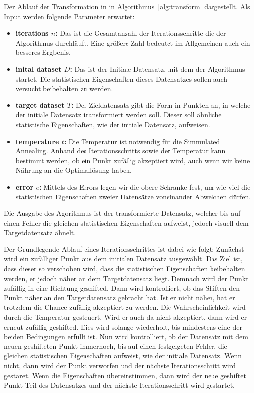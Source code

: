 \documentclass[sigconf]{acmart}
\begin{document}
Der Ablauf der Transformation in in Algorithmus~\ref{alg:transform} dargestellt. Als Input werden folgende Parameter erwartet:
\begin{itemize}
  \item \textbf{iterations $n$:} Das ist die Gesamtanzahl der Iterationsschritte die der Algorithmus durchläuft. Eine größere Zahl bedeutet im Allgemeinen auch ein besseres Ergbenis.
  \item \textbf{inital dataset $D$:} Das ist der Initiale Datensatz, mit dem der Algorithmus startet. Die statistischen Eigenschaften dieses Datensatzes sollen auch versucht beibehalten zu werden.
  \item \textbf{target dataset $T$:} Der Zieldatensatz gibt die Form in Punkten an, in welche der initiale Datensatz transformiert werden soll. Dieser soll ähnliche statistische Eigenschaften, wie der initiale Datensatz, aufweisen.
  \item \textbf{temperature $t$:} Die Temperatur ist notwendig für die Simmulated Annealing. Anhand des Iterationsschritts sowie der Temperatur kann bestimmt werden, ob ein Punkt zufällig akzeptiert wird, auch wenn wir keine Nährung an die Optimallösung haben.
  \item \textbf{error $e$:} Mittels des Errors legen wir die obere Schranke fest, um wie viel die statistischen Eigenschaften zweier Datensätze voneinander Abweichen dürfen.
\end{itemize}

Die Ausgabe des Agorithmus ist der transformierte Datensatz, welcher bis auf einen Fehler die gleichen statistischen Eigenschaften aufweist, jedoch visuell dem Targetdatensatz ähnelt. 

Der Grundlegende Ablauf eines Iterationsschrittes ist dabei wie folgt: Zunächst wird ein zufälliger Punkt aus dem initialen Datensatz ausgewählt. Das Ziel ist, dass dieser so verschoben wird, dass die statistischen Eigenschaften beibehalten werden, er jedoch näher an dem Targetdatensatz liegt. Demnach wird der Punkt zufällig in eine Richtung geshifted. 
Dann wird kontrolliert, ob das Shiften den Punkt näher an den Targetdatensatz gebracht hat. Ist er nicht näher, hat er trotzdem die Chance zufällig akzeptiert zu werden. Die Wahrscheinlichkeit wird durch die Temperatur gesteuert. 
Wird er auch da nicht akzeptiert, dann wird er erneut zufällig geshifted. Dies wird solange wiederholt, bis mindestens eine der beiden Bedingungen erfüllt ist. 
Nun wird kontrolliert, ob der Datensatz mit dem neuen geshifteten Punkt immernoch, bis auf einen festgelgeten Fehler, die gleichen statistischen Eigenschaften aufweist, wie der initiale Datensatz. Wenn nicht, dann wird der Punkt verworfen und der nächste Iterationsschritt wird gestaret. Wenn die Eigenschaften übereinstimmen, dann wird der neue geshiftet Punkt Teil des Datensatzes und der nächste Iterationsschritt wird gestartet. 
\end{document}
